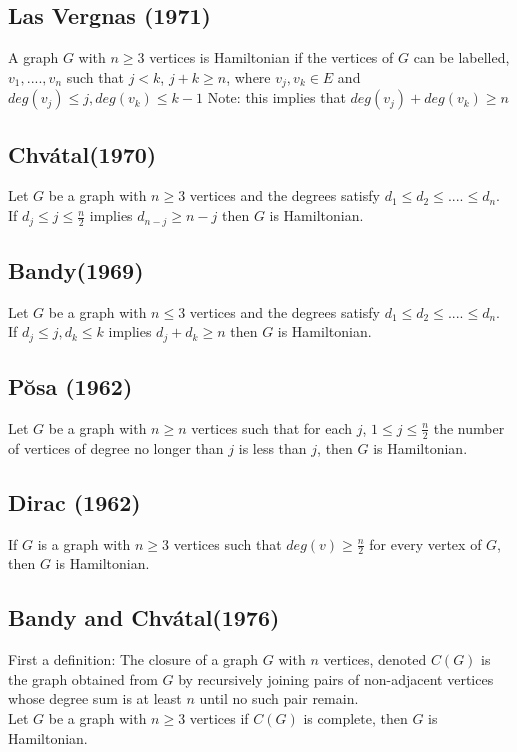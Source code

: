   \subsection{Las Vergnas (1971)}
  A graph $G$ with $n \geq 3$ vertices is Hamiltonian if the vertices of $G$ can be labelled, $v_{1}, .... ,v_{n}$ such that $j < k$, $j + k \geq n$, where $v_{j}, v_{k} \in E$ and $deg(v_{j}) \leq j, deg(v_{k}) \leq k - 1$ Note: this implies that $deg(v_{j}) + deg(v_{k}) \geq n$
    \subsection{Chv\'{a}tal(1970)}
  Let $G$ be a graph with $n \geq 3$ vertices and the degrees satisfy $d_{1} \leq d_{2} \leq .... \leq d_{n}$. If $d_{j} \leq j \leq \frac{n}{2}$ implies $d_{n-j} \geq n - j$ then $G$ is Hamiltonian.
    
    \subsection{Bandy(1969)}
  Let $G$ be a graph with $n \leq 3$ vertices and the degrees satisfy $d_{1} \leq d_{2} \leq .... \leq d_{n}$. If $d_{j} \leq j, d_{k} \leq k$ implies $d_{j} + d_{k} \geq n$ then $G$ is Hamiltonian.
    
    \subsection{P\u{o}sa (1962)}
  Let $G$ be a graph with $n \geq n$ vertices such that for each $j$, $1 \leq j \leq \frac{n}{2}$ the number of vertices of degree no longer than $j$ is less than $j$, then $G$ is Hamiltonian.
    
    \subsection{Dirac (1962)}
  If $G$ is a graph with $n \geq 3$ vertices such that $deg(v) \geq \frac{n}{2}$ for every vertex of $G$, then $G$ is Hamiltonian.
    
    \subsection{Bandy and Chv\'{a}tal(1976)}
  First a definition: The closure of a graph $G$ with $n$ vertices, denoted $C(G)$ is the graph obtained from $G$ by recursively joining pairs of non-adjacent vertices whose degree sum is at least $n$ until no such pair remain.\\
    Let $G$ be a graph with $n \geq 3$ vertices if $C(G)$ is complete, then $G$ is Hamiltonian.



